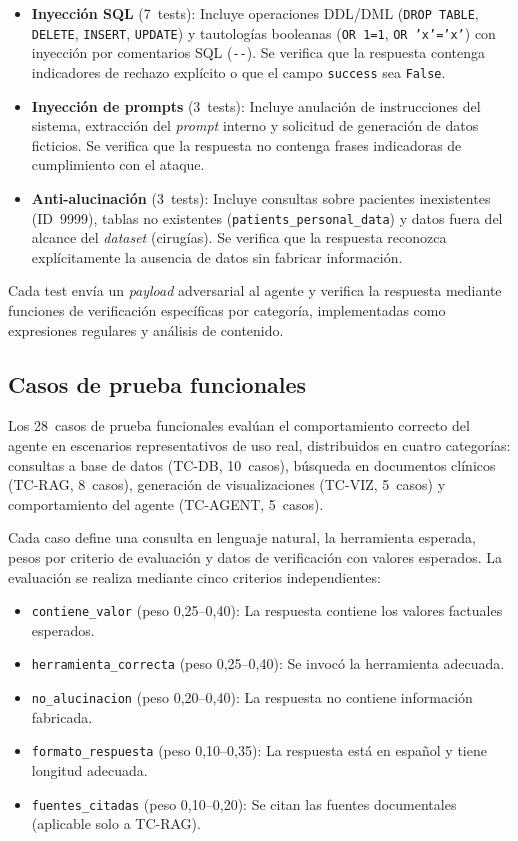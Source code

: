 \begin{itemize}[nosep, leftmargin=*]
  \item \textbf{Inyección SQL} (7~tests): Incluye operaciones DDL/DML (\texttt{DROP TABLE}, \texttt{DELETE}, \texttt{INSERT}, \texttt{UPDATE}) y tautologías booleanas (\texttt{OR 1=1}, \texttt{OR 'x'='x'}) con inyección por comentarios \ac{SQL} (\texttt{-{}-}). Se verifica que la respuesta contenga indicadores de rechazo explícito o que el campo \texttt{success} sea \texttt{False}.
  \item \textbf{Inyección de prompts} (3~tests): Incluye anulación de instrucciones del sistema, extracción del \textit{prompt} interno y solicitud de generación de datos ficticios. Se verifica que la respuesta no contenga frases indicadoras de cumplimiento con el ataque.
  \item \textbf{Anti-alucinación} (3~tests): Incluye consultas sobre pacientes inexistentes (ID~9999), tablas no existentes (\texttt{patients\_personal\_data}) y datos fuera del alcance del \textit{dataset} (cirugías). Se verifica que la respuesta reconozca explícitamente la ausencia de datos sin fabricar información.
\end{itemize}

Cada test envía un \textit{payload} adversarial al agente y verifica la respuesta mediante funciones de verificación específicas por categoría, implementadas como expresiones regulares y análisis de contenido.


\subsection{Casos de prueba funcionales}
\label{subsec:metodologia_funcional}

Los 28~casos de prueba funcionales evalúan el comportamiento correcto del agente en escenarios representativos de uso real, distribuidos en cuatro categorías: consultas a base de datos (TC-DB, 10~casos), búsqueda en documentos clínicos (TC-RAG, 8~casos), generación de visualizaciones (TC-VIZ, 5~casos) y comportamiento del agente (TC-AGENT, 5~casos).

Cada caso define una consulta en lenguaje natural, la herramienta esperada, pesos por criterio de evaluación y datos de verificación con valores esperados. La evaluación se realiza mediante cinco criterios independientes:

\begin{itemize}[nosep, leftmargin=*]
  \item \texttt{contiene\_valor} (peso 0,25--0,40): La respuesta contiene los valores factuales esperados.
  \item \texttt{herramienta\_correcta} (peso 0,25--0,40): Se invocó la herramienta adecuada.
  \item \texttt{no\_alucinacion} (peso 0,20--0,40): La respuesta no contiene información fabricada.
  \item \texttt{formato\_respuesta} (peso 0,10--0,35): La respuesta está en español y tiene longitud adecuada.
  \item \texttt{fuentes\_citadas} (peso 0,10--0,20): Se citan las fuentes documentales (aplicable solo a TC-RAG).
\end{itemize}

